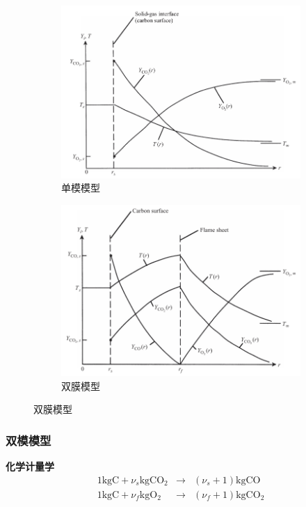 \begin{figure}[H]
    \centering
    \begin{subfigure}{.15\textwidth}
        \includegraphics[width=.99\textwidth]{img/single_film.png}
        \caption{单模模型}
    \end{subfigure}
    \begin{subfigure}{.15\textwidth}
        \includegraphics[width=.99\textwidth]{img/double_film.png}
        \caption{双膜模型}
    \end{subfigure}
\end{figure}

\subsubsection{双模模型}
\textbf{化学计量学}
\begin{eqnarray}
    \mathrm{1kgC}+\nu_s \mathrm{kgCO_2}&\rightarrow& (\nu_s+1)\mathrm{kgCO} \\
    \mathrm{1kgC}+\nu_f \mathrm{kg O_2} &\rightarrow& (\nu_f+1)\mathrm{kg CO_2}
\end{eqnarray}

